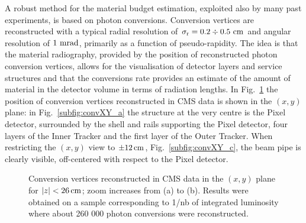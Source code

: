 \documentclass[a4paper]{jpconf}
\begin{document}
A robust method for the material budget estimation, exploited also by many
past experiments, is based on photon conversions. 
Conversion vertices are reconstructed with a typical radial resolution of $\rm \sigma_r = 0.2 \div 0.5~cm$ and  angular resolution of  $1~{\rm mrad}$, primarily
as a function of pseudo-rapidity.
The idea is that the
material radiography, provided by the position of reconstructed photon
conversion vertices, allows for the visualisation of detector layers
and service structures and that the conversions rate provides an estimate of the amount of material in the
detector volume in terms of radiation lengths.
In Fig.~\ref{fig:convXY} the position of conversion vertices reconstructed in CMS data is shown in the $(x,y)$ plane:
in Fig.~\ref{subfig:convXY_a} the structure at the very centre is the Pixel detector,
surrounded by the shell and rails supporting the Pixel detector, four layers of the Inner Tracker and the first layer of the Outer Tracker.
When restricting the $(x,y)$ view to $\pm 12\rm \, cm$, Fig.~\ref{subfig:convXY_c}, the beam pipe is clearly visible, off-centered with respect to
the Pixel detector. 
%
\begin{figure}[t!]
  \begin{center}
    \caption{Conversion vertices reconstructed in CMS data in the $(x,y)$ plane for $|z|<26\rm \, cm$; zoom increases from (a) to (b). 
    Results were obtained on a sample corresponding to 1/nb of integrated luminosity where about 260 000 photon conversions were reconstructed. 
}
\label{fig:convXY}
\end{center}
\end{figure}
\end{document}
